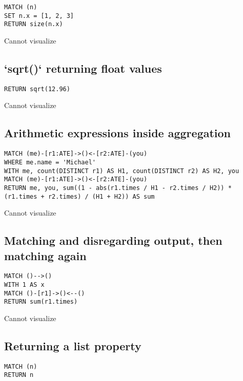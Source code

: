 \begin{lstlisting}
MATCH (n)
SET n.x = [1, 2, 3]
RETURN size(n.x)
\end{lstlisting}

Cannot visualize
\subsection{`sqrt()` returning float values}

\begin{lstlisting}
RETURN sqrt(12.96)
\end{lstlisting}

Cannot visualize
\subsection{Arithmetic expressions inside aggregation}

\begin{lstlisting}
MATCH (me)-[r1:ATE]->()<-[r2:ATE]-(you)
WHERE me.name = 'Michael'
WITH me, count(DISTINCT r1) AS H1, count(DISTINCT r2) AS H2, you
MATCH (me)-[r1:ATE]->()<-[r2:ATE]-(you)
RETURN me, you, sum((1 - abs(r1.times / H1 - r2.times / H2)) * (r1.times + r2.times) / (H1 + H2)) AS sum
\end{lstlisting}

Cannot visualize
\subsection{Matching and disregarding output, then matching again}

\begin{lstlisting}
MATCH ()-->()
WITH 1 AS x
MATCH ()-[r1]->()<--()
RETURN sum(r1.times)
\end{lstlisting}

Cannot visualize
\subsection{Returning a list property}

\begin{lstlisting}
MATCH (n)
RETURN n
\end{lstlisting}


